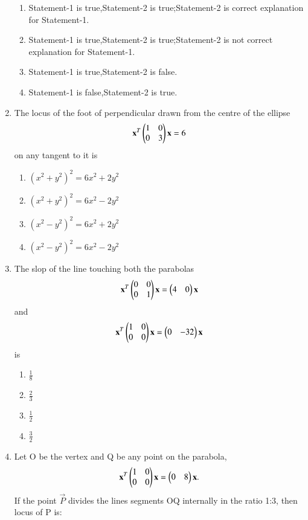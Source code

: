 \begin{enumerate}[label=\arabic*.,ref=\thesubsection.\theenumi]
    \begin{enumerate}
    \item Statement-1 is true,Statement-2 is true;Statement-2 is correct explanation for Statement-1.
    \item Statement-1 is true,Statement-2 is true;Statement-2 is not correct explanation for Statement-1.
    \item Statement-1 is true,Statement-2 is false.
    \item Statement-1 is false,Statement-2 is true.
    \end{enumerate}
    \item The locus of the foot of perpendicular drawn from the centre of the ellipse
    \begin{align}
    \mathbf{x}^T\begin{pmatrix}1&0\\0&3\end{pmatrix}\mathbf{x}=6
    \end{align} on any tangent to it is
    \begin{enumerate}
    \item $(x^2+y^2)^2=6x^2+2y^2$
    \item $(x^2+y^2)^2=6x^2-2y^2$
    \item $(x^2-y^2)^2=6x^2+2y^2$
    \item $(x^2-y^2)^2=6x^2-2y^2$
    \end{enumerate}
    \item The slop of the line touching both the parabolas 
    \begin{align}
    \mathbf{x}^T\begin{pmatrix}0&0\\0&1\end{pmatrix}\mathbf{x}=\begin{pmatrix}4&0\end{pmatrix}\mathbf{x}
    \end{align} and 
    \begin{align}
    \mathbf{x}^T\begin{pmatrix}1&0\\0&0\end{pmatrix}\mathbf{x}=\begin{pmatrix}0&-32\end{pmatrix}\mathbf{x}
    \end{align} is 
    \begin{enumerate}
    \item $\frac{1}{8}$
    \item $\frac{2}{3}$
    \item $\frac{1}{2}$
    \item $\frac{3}{2}$
    \end{enumerate}
    \item Let O be the vertex and Q be any point on the parabola,
    \begin{align}
    \mathbf{x}^T\begin{pmatrix}1&0\\0&0\end{pmatrix}\mathbf{x}=\begin{pmatrix}0&8\end{pmatrix}\mathbf{x}.
    \end{align} If the point $\vec{P}$ divides the lines segments OQ internally in the ratio 1:3, then locus of P is:

\end{enumerate}
